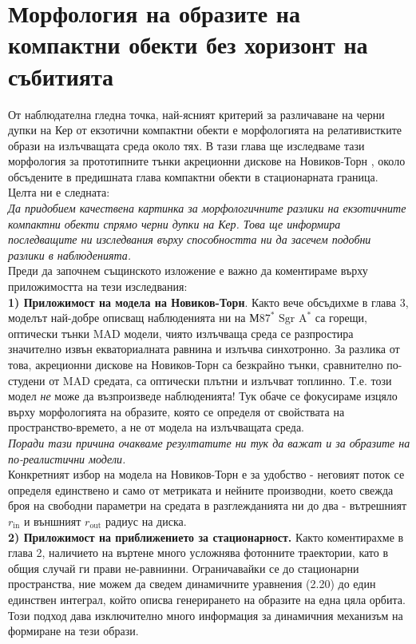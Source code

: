 \section{Морфология на образите на компактни обекти без хоризонт на събитията}
От наблюдателна гледна точка, най-ясният критерий за различаване на черни дупки на Кер от екзотични компактни обекти е морфологията на релативистките образи на излъчващата среда около тях. В тази глава ще изследваме тази морфология за прототипните тънки акреционни дискове на Новиков-Торн \cite{Page1973}, около обсъдените в предишната глава компактни обекти в стационарната граница. Целта ни е следната:\\

\emph{Да придобием качествена картинка за морфологичните разлики на екзотичните компактни обекти спрямо черни дупки на Кер. Това ще информира последващите ни изследвания върху способността ни да засечем подобни разлики в наблюденията.}\\

Преди да започнем същинското изложение е важно да коментираме върху приложимостта на тези изследвания:\\

\textbf{1) Приложимост на модела на Новиков-Торн}. Както вече обсъдихме в глава 3, моделът най-добре описващ наблюденията ни на М$87^*$ $\text{Sgr A}^*$ са горещи, оптически тънки MAD модели, чиято излъчваща среда се разпростира значително извън екваториалната равнина и излъчва синхотронно. За разлика от това, акреционни дискове на Новиков-Торн са безкрайно тънки, сравнително по-студени от MAD средата, са оптически плътни и излъчват топлинно. Т.е. този модел \emph{не} може да възпроизведе наблюденията! Тук обаче се фокусираме изцяло върху морфологията на образите, която се определя от свойствата на пространство-времето, а не от модела на излъчващата среда.\\

\emph{Поради тази причина очакваме резултатите ни тук да важат и за образите на по-реалистични модели.} \\

Конкретният избор на модела на Новиков-Торн е за удобство - неговият поток се определя единствено и само от метриката и нейните производни, което свежда броя на свободни параметри на средата в разглежданията ни до два - вътрешният $r_{\text{in}}$ и външният $r_\text{out}$ радиус на диска.\\

\textbf{2) Приложимост на приближението за стационарност.} Както коментирахме в глава 2, наличието на въртене много усложнява фотонните траектории, като в общия случай ги прави не-равнинни. Ограничавайки се до стационарни пространства, ние можем да сведем динамичните уравнения (2.20) до един единствен интеграл, който описва генерирането на образите на една цяла орбита. Този подход дава изключително много информация за динамичния механизъм на формиране на тези образи.\\

